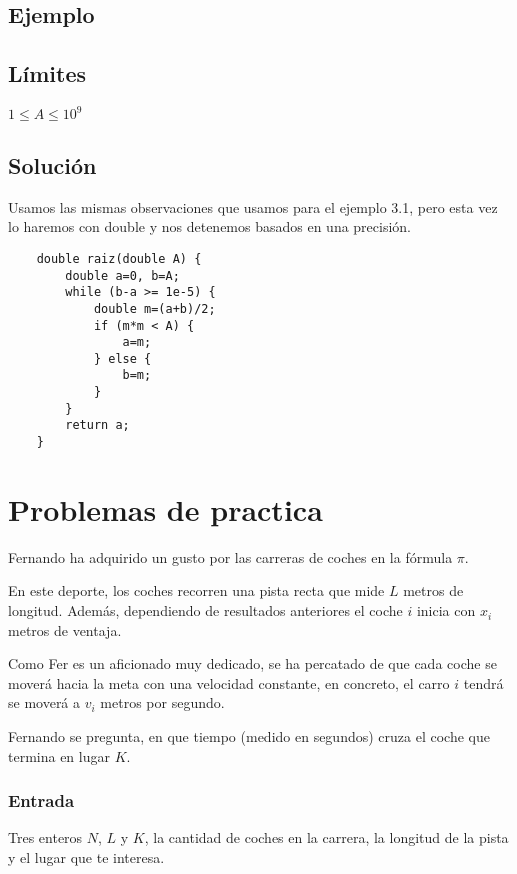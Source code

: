 \subsection*{Ejemplo}
\begin{casebox2}
\end{casebox2}
\subsection*{Límites}
\begin{plimits}
	\item \(1\leq A \leq 10^9\)
\end{plimits}
\subsection*{Solución}
Usamos las mismas observaciones que usamos para el ejemplo 3.1, pero esta vez lo haremos con double y nos detenemos basados en una precisión.
\begin{lstlisting}
	double raiz(double A) {
		double a=0, b=A;
		while (b-a >= 1e-5) {
			double m=(a+b)/2;
			if (m*m < A) {
				a=m;
			} else {
				b=m;
			}
		}
		return a;
	}
\end{lstlisting}

\newpage
\section*{Problemas de practica}
\problemtitle Fernando ha adquirido un gusto por las carreras de coches en la fórmula \(\pi\).

En este deporte, los coches recorren una pista recta que mide \(L\) metros de longitud. Además, dependiendo de resultados anteriores el coche \(i\) inicia con \(x_i\) metros de ventaja.

Como Fer es un aficionado muy dedicado, se ha percatado de que cada coche se moverá hacia la meta con una velocidad constante, en concreto, el carro \(i\) tendrá se moverá a \(v_i\) metros por segundo.

Fernando se pregunta, en que tiempo (medido en segundos) cruza el coche que termina en lugar \(K\).

\subsubsection*{Entrada}
Tres enteros \(N\), \(L\) y \(K\), la cantidad de coches en la carrera, la longitud de la pista y el lugar que te interesa.

